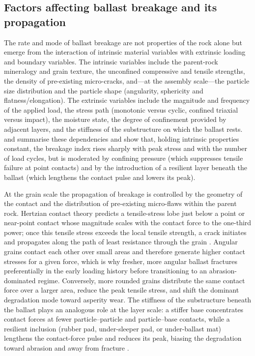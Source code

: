 \subsection{Factors affecting ballast breakage and its propagation}
\label{sec:lit-breakage}

The rate and mode of ballast breakage are not properties of the rock alone
but emerge from the interaction of intrinsic material variables with
extrinsic loading and boundary variables. The intrinsic variables include
the parent-rock mineralogy and grain texture, the unconfined compressive
and tensile strengths, the density of pre-existing micro-cracks, and---at
the assembly scale---the particle size distribution and the particle shape
(angularity, sphericity and flatness/elongation). The extrinsic variables
include the magnitude and frequency of the applied load, the stress path
(monotonic versus cyclic, confined triaxial versus impact), the moisture
state, the degree of confinement provided by adjacent layers, and the
stiffness of the substructure on which the ballast rests.
\citet{Indraratna2011} and \citet{Sun2014} summarise these dependencies
and show that, holding intrinsic properties constant, the breakage index
rises sharply with peak stress and with the number of load cycles, but is
moderated by confining pressure (which suppresses tensile failure at point
contacts) and by the introduction of a resilient layer beneath the
ballast (which lengthens the contact pulse and lowers its peak).

At the grain scale the propagation of breakage is controlled by the
geometry of the contact and the distribution of pre-existing micro-flaws
within the parent rock. Hertzian contact theory predicts a tensile-stress
lobe just below a point or near-point contact whose magnitude scales with
the contact force to the one-third power; once this tensile stress
exceeds the local tensile strength, a crack initiates and propagates
along the path of least resistance through the grain \citep{Lim2005}.
Angular grains contact each other over small areas and therefore generate
higher contact stresses for a given force, which is why fresher, more
angular ballast fractures preferentially in the early loading history
before transitioning to an abrasion-dominated regime. Conversely, more
rounded grains distribute the same contact force over a larger area,
reduce the peak tensile stress, and shift the dominant degradation mode
toward asperity wear. The stiffness of the substructure beneath the
ballast plays an analogous role at the layer scale: a stiffer base
concentrates contact forces at fewer particle--particle and particle--base
contacts, while a resilient inclusion (rubber pad, under-sleeper pad, or
under-ballast mat) lengthens the contact-force pulse and reduces its
peak, biasing the degradation toward abrasion and away from fracture
\citep{SolSanchez2015, Navaratnarajah2017}.

